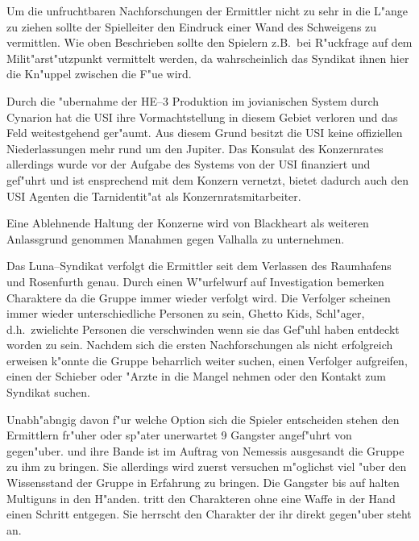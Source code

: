 \begin{remarks}
	Um die unfruchtbaren Nachforschungen der Ermittler nicht zu sehr in die L"ange zu ziehen sollte der Spielleiter den Eindruck einer Wand des Schweigens zu vermittlen. Wie oben Beschrieben sollte den Spielern z.B.~bei R"uckfrage auf dem Milit"arst"utzpunkt vermittelt werden, da\3 wahrscheinlich das Syndikat ihnen hier die Kn"uppel zwischen die F"u\3e wird.

	Durch die "ubernahme der HE--3 Produktion im jovianischen System durch Cynarion hat die USI ihre Vormachtstellung in diesem Gebiet verloren und das Feld weitestgehend ger"aumt. Aus diesem Grund besitzt die USI keine offiziellen Niederlassungen mehr rund um den Jupiter. Das Konsulat des Konzernrates allerdings wurde vor der Aufgabe des Systems von der USI finanziert und gef"uhrt und ist ensprechend mit dem Konzern vernetzt, bietet dadurch auch den USI Agenten die Tarnidentit"at als Konzernratsmitarbeiter.

	Eine Ablehnende Haltung der Konzerne wird von Blackheart als weiteren Anlassgrund genommen Ma\3nahmen gegen Valhalla zu unternehmen.
\end{remarks}

\newcommand{\xl}{\pinyin{Xiao3} \pinyin{Long2}}
\newcommand{\xlsn}{\pinyin{Xiao3} \pinyin{Long2}}

Das Luna--Syndikat verfolgt die Ermittler seit dem Verlassen des Raumhafens und Rosenfurth genau. Durch einen W"urfelwurf auf Investigation bemerken Charaktere da\3 die Gruppe immer wieder verfolgt wird. Die Verfolger scheinen immer wieder unterschiedliche Personen zu sein, Ghetto Kids, Schl"ager, d.h.~zwielichte Personen die verschwinden wenn sie das Gef"uhl haben entdeckt worden zu sein. Nachdem sich die ersten Nachforschungen als nicht erfolgreich erweisen k"onnte die Gruppe beharrlich weiter suchen, einen Verfolger aufgreifen, einen der Schieber oder "Arzte in die Mangel nehmen oder den Kontakt zum Syndikat suchen. 

Unabh"abngig davon f"ur welche Option sich die Spieler entscheiden stehen den Ermittlern fr"uher oder sp"ater unerwartet 9 Gangster angef"uhrt von \xl{} gegen"uber. \xlsn{} und ihre Bande ist im Auftrag von Nemessis ausgesandt die Gruppe zu ihm zu bringen. Sie allerdings wird zuerst versuchen m"oglichst viel "uber den Wissensstand der Gruppe in Erfahrung zu bringen. Die Gangster bis auf \xlsn{} halten Multiguns in den H"anden. \xlsn{} tritt den Charakteren ohne eine Waffe in der Hand einen Schritt entgegen. Sie herrscht den Charakter der ihr direkt gegen"uber steht an.

